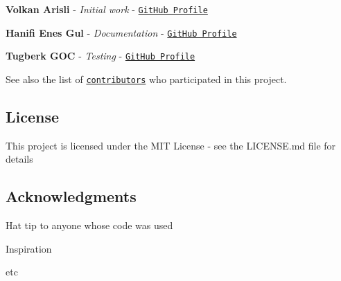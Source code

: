 \begin{DoxyItemize}
\item {\bfseries Volkan Arisli} -\/ {\itshape Initial work} -\/ \href{https://github.com/volkanarisli}{\tt Git\+Hub Profile}
\item {\bfseries Hanifi Enes Gul} -\/ {\itshape Documentation} -\/ \href{https://github.com/r0sky}{\tt Git\+Hub Profile}
\item {\bfseries Tugberk G\+OC} -\/ {\itshape Testing} -\/ \href{https://github.com/tugberkgoc}{\tt Git\+Hub Profile}
\end{DoxyItemize}

See also the list of \href{https://github.com/your/project/contributors}{\tt contributors} who participated in this project.

\subsection*{License}

This project is licensed under the M\+IT License -\/ see the L\+I\+C\+E\+N\+SE.md file for details

\subsection*{Acknowledgments}


\begin{DoxyItemize}
\item Hat tip to anyone whose code was used
\item Inspiration
\item etc 
\end{DoxyItemize}
